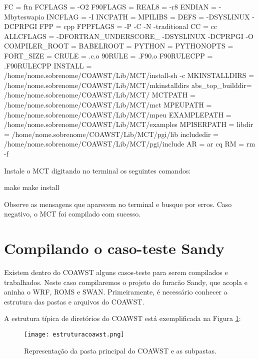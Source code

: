 \begin{bashcode}
FC  	    = ftn
FCFLAGS	 = -O2
F90FLAGS        = 
REAL8           = -r8
ENDIAN          = -Mbyteswapio
INCFLAG         = -I
INCPATH         =
MPILIBS         = 
DEFS            = -DSYSLINUX -DCPRPGI
FPP	     = cpp
FPPFLAGS        = -P -C -N -traditional
CC              = cc
ALLCFLAGS       = -DFORTRAN_UNDERSCORE_ -DSYSLINUX -DCPRPGI -O
COMPILER_ROOT   = 
BABELROOT       = 
PYTHON          = 
PYTHONOPTS      = 
FORT_SIZE       = 
CRULE           = .c.o
90RULE          = .F90.o
F90RULECPP      = .F90RULECPP
INSTALL         = /home/nome.sobrenome/COAWST/Lib/MCT/install-sh -c
MKINSTALLDIRS   = /home/nome.sobrenome/COAWST/Lib/MCT/mkinstalldirs
abs_top_builddir= /home/nome.sobrenome/COAWST/Lib/MCT/
MCTPATH         = /home/nome.sobrenome/COAWST/Lib/MCT/mct
MPEUPATH        = /home/nome.sobrenome/COAWST/Lib/MCT/mpeu
EXAMPLEPATH     = /home/nome.sobrenome/COAWST/Lib/MCT/examples
MPISERPATH      = 
libdir          = /home/nome.sobrenome/COAWST/Lib/MCT/pgi/lib
includedir      = /home/nome.sobrenome/COAWST/Lib/MCT/pgi/include
AR	      = ar cq
RM	      = rm -f
\end{bashcode}
\bigskip

\noindent Instale o MCT digitando no terminal os seguintes comandos:
\bigskip

\begin{bashcode}
make
make install
\end{bashcode}
\bigskip
\noindent Observe as mensagens que aparecem no terminal e busque por erros. Caso negativo, o MCT foi compilado com sucesso.
\bigskip


\section{Compilando o caso-teste Sandy}
\bigskip

\noindent Existem dentro do COAWST alguns casos-teste para serem compilados e trabalhados. Neste caso compilaremos o projeto do furacão Sandy, que acopla e aninha o WRF, ROMS e SWAN. Primeiramente, é necessário conhecer a estrutura das pastas e arquivos do COAWST.
\bigskip

\noindent A estrutura típica de diretórios do COAWST está exemplificada na Figura \textcolor{bleu_cite}{\ref{pastascoa}}:
\bigskip

\begin{figure}[H]
    \centering
    \captionsetup{justification=justified}
    \texttt{[image: estruturacoawst.png]}
    \caption{Representação da pasta principal do COAWST e as subpastas.}
    \label{pastascoa}
\end{figure}
\bigskip

